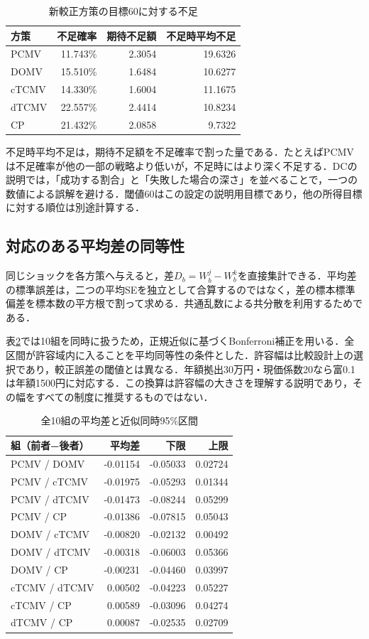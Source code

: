 \documentclass[11pt,a4paper]{article}
\numberwithin{equation}{section}
\numberwithin{table}{section}
\numberwithin{figure}{section}
\theoremstyle{plain}
\theoremstyle{definition}
\begin{document}
\begin{table}[htbp]\centering\small
\caption{新較正方策の目標60に対する不足}\label{tab:full-shortfall}
\begin{tabular}{lrrr}\toprule
方策 & 不足確率 & 期待不足額 & 不足時平均不足 \\ \midrule
PCMV & 11.743\% & 2.3054 & 19.6326 \\
DOMV & 15.510\% & 1.6484 & 10.6277 \\
cTCMV & 14.330\% & 1.6004 & 11.1675 \\
dTCMV & 22.557\% & 2.4414 & 10.8234 \\
CP & 21.432\% & 2.0858 & 9.7322 \\
\bottomrule\end{tabular}\end{table}

不足時平均不足は，期待不足額を不足確率で割った量である．たとえばPCMVは不足確率が他の一部の戦略より低いが，不足時にはより深く不足する．DCの説明では，「成功する割合」と「失敗した場合の深さ」を並べることで，一つの数値による誤解を避ける．閾値60はこの設定の説明用目標であり，他の所得目標に対する順位は別途計算する．

\subsection{対応のある平均差の同等性}
同じショックを各方策へ与えると，差$D_b=W^{j}_b-W^{k}_b$を直接集計できる．平均差の標準誤差は，二つの平均SEを独立として合算するのではなく，差の標本標準偏差を標本数の平方根で割って求める．共通乱数による共分散を利用するためである．

表\ref{tab:paired-full}では10組を同時に扱うため，正規近似に基づくBonferroni補正を用いる．全区間が許容域内に入ることを平均同等性の条件とした．許容幅は比較設計上の選択であり，較正誤差の閾値とは異なる．年額拠出30万円・現価係数20なら富0.1は年額1500円に対応する．この換算は許容幅の大きさを理解する説明であり，その幅をすべての制度に推奨するものではない．

\begin{table}[htbp]\centering\small
\caption{全10組の平均差と近似同時95\%区間}\label{tab:paired-full}
\begin{tabular}{lrrr}\toprule
組（前者−後者） & 平均差 & 下限 & 上限 \\ \midrule
PCMV / DOMV & -0.01154 & -0.05033 & 0.02724 \\
PCMV / cTCMV & -0.01975 & -0.05293 & 0.01344 \\
PCMV / dTCMV & -0.01473 & -0.08244 & 0.05299 \\
PCMV / CP & -0.01386 & -0.07815 & 0.05043 \\
DOMV / cTCMV & -0.00820 & -0.02132 & 0.00492 \\
DOMV / dTCMV & -0.00318 & -0.06003 & 0.05366 \\
DOMV / CP & -0.00231 & -0.04460 & 0.03997 \\
cTCMV / dTCMV & 0.00502 & -0.04223 & 0.05227 \\
cTCMV / CP & 0.00589 & -0.03096 & 0.04274 \\
dTCMV / CP & 0.00087 & -0.02535 & 0.02709 \\
\bottomrule\end{tabular}\end{table}
\end{document}
